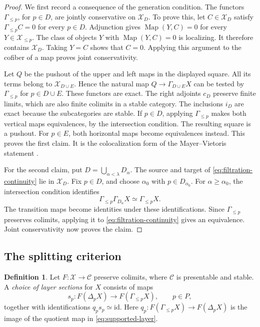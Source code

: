 \documentclass[11pt,reqno]{amsart}
\theoremstyle{definition}
\newtheorem{definition}[theorem]{Definition}
\theoremstyle{remark}
\theoremstyle{plain}
\numberwithin{equation}{section}
\DeclareMathOperator{\Map}{Map}
\begin{document}
\begin{proof}
We first record a consequence of the generation condition.
The functors \(\Gamma_{\leq p}\), for \(p\in D\), are jointly
conservative on \(\mathcal X_D\).
To prove this, let \(C\in\mathcal X_D\) satisfy
\(\Gamma_{\leq p}C=0\) for every \(p\in D\).
Adjunction gives \(\Map(Y,C)=0\) for every
\(Y\in\mathcal X_{\leq p}\).
The class of objects \(Y\) with \(\Map(Y,C)=0\) is localizing.
It therefore contains \(\mathcal X_D\).
Taking \(Y=C\) shows that \(C=0\).
Applying this argument to the cofiber of a map proves joint
conservativity.

Let \(Q\) be the pushout of the upper and left maps in the displayed
square. All its terms belong to \(\mathcal X_{D\cup E}\).
Hence the natural map \(Q\to\Gamma_{D\cup E}X\) can be tested by
\(\Gamma_{\leq p}\) for \(p\in D\cup E\).
These functors are exact. The right adjoints \(c_D\) preserve finite
limits, which are also finite colimits in a stable category.
The inclusions \(i_D\) are exact because the subcategories are stable.
If \(p\in D\), applying \(\Gamma_{\leq p}\) makes both vertical maps
equivalences, by the intersection condition.
The resulting square is a pushout.
For \(p\in E\), both horizontal maps become equivalences instead.
This proves the first claim.
It is the colocalization form of the Mayer--Vietoris statement
\cite[Lemma 3.3.5(1)]{AMGR}.

For the second claim, put \(D=\bigcup_{\alpha<\lambda}D_\alpha\).
The source and target of \eqref{eq:filtration-continuity} lie in
\(\mathcal X_D\).
Fix \(p\in D\), and choose \(\alpha_0\) with \(p\in D_{\alpha_0}\).
For \(\alpha\geq\alpha_0\), the intersection condition identifies
\[
 \Gamma_{\leq p}\Gamma_{D_\alpha}X
 \simeq
 \Gamma_{\leq p}X.
\]
The transition maps become identities under these identifications.
Since \(\Gamma_{\leq p}\) preserves colimits, applying it to
\eqref{eq:filtration-continuity} gives an equivalence.
Joint conservativity now proves the claim.
\end{proof}

\subsection{The splitting criterion}

\begin{definition}
\label{def:layer-sections}
Let \(F:\mathcal X\to\mathcal C\) preserve colimits, where
\(\mathcal C\) is presentable and stable.
A \emph{choice of layer sections} for \(X\) consists of maps
\[
 s_p:F(\Delta_pX)\longrightarrow F(\Gamma_{\leq p}X),
 \qquad p\in P,
\]
together with identifications \(q_ps_p\simeq\mathrm{id}\).
Here \(q_p:F(\Gamma_{\leq p}X)\to F(\Delta_pX)\) is the image
of the quotient map in \eqref{eq:supported-layer}.
\end{definition}
\end{document}
